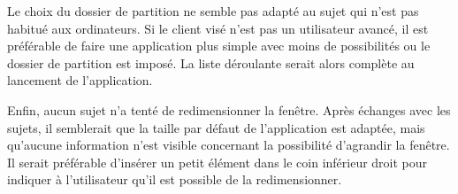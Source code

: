 \documentclass[a4paper, 12pt]{article}
\begin{document}
    Le choix du dossier de partition ne semble pas adapté au sujet qui n'est pas habitué aux ordinateurs. Si le client visé n'est pas un utilisateur avancé, il est préférable de faire une application plus simple avec moins de possibilités ou le dossier de partition est imposé. La liste déroulante serait alors complète au lancement de l'application.
    
    Enfin, aucun sujet n'a tenté de redimensionner la fenêtre. Après échanges avec les sujets, il semblerait que la taille par défaut de l'application est adaptée, mais qu'aucune information n'est visible concernant la possibilité d'agrandir la fenêtre. Il serait préférable d'insérer un petit élément dans le coin inférieur droit pour indiquer à l'utilisateur qu'il est possible de la redimensionner.
    
\end{document}
